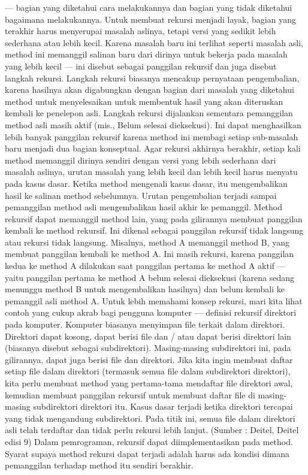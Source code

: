\documentclass[a4paper,12pt]{article}
\begin{document}
— bagian yang diketahui cara melakukannya dan bagian yang tidak diketahui bagaimana
melakukannya. Untuk membuat rekursi menjadi layak, bagian yang terakhir harus menyerupai
masalah aslinya, tetapi versi yang sedikit lebih sederhana atau lebih kecil. Karena masalah
baru ini terlihat seperti masalah asli, method ini memanggil salinan baru dari dirinya untuk
bekerja pada masalah yang lebih kecil — ini disebut sebagai panggilan rekursif dan juga
disebut langkah rekursi. Langkah rekursi biasanya mencakup pernyataan pengembalian, karena hasilnya akan digabungkan dengan bagian dari masalah yang diketahui method untuk
menyelesaikan untuk membentuk hasil yang akan diteruskan kembali ke penelepon asli. Langkah rekursi dijalankan sementara pemanggilan method asli masih aktif (mis., Belum
selesai dieksekusi). Ini dapat menghasilkan lebih banyak panggilan rekursif karena method ini
membagi setiap sub-masalah baru menjadi dua bagian konseptual. Agar rekursi akhirnya
berakhir, setiap kali method memanggil dirinya sendiri dengan versi yang lebih sederhana dari
masalah aslinya, urutan masalah yang lebih kecil dan lebih kecil harus menyatu pada kasus
dasar. Ketika method mengenali kasus dasar, itu mengembalikan hasil ke salinan method
sebelumnya. Urutan pengembalian terjadi sampai pemanggilan method asli mengembalikan
hasil akhir ke pemanggil. Method rekursif dapat memanggil method lain, yang pada gilirannya membuat panggilan
kembali ke method rekursif. Ini dikenal sebagai panggilan rekursif tidak langsung atau rekursi
tidak langsung. Misalnya, method A memanggil method B, yang membuat panggilan kembali
ke method A. Ini masih rekursi, karena panggilan kedua ke method A dilakukan saat panggilan
pertama ke method A aktif — yaitu panggilan pertama ke method A belum selesai dieksekusi
(karena sedang menunggu method B untuk mengembalikan hasilnya) dan belum kembali ke
pemanggil asli method A. Untuk lebih memahami konsep rekursi, mari kita lihat contoh yang
cukup akrab bagi pengguna komputer — definisi rekursif direktori pada komputer. Komputer
biasanya menyimpan file terkait dalam direktori. Direktori dapat kosong, dapat berisi file dan
/ atau dapat berisi direktori lain (biasanya disebut sebagai subdirektori). Masing-masing
subdirektori ini, pada gilirannya, dapat juga berisi file dan direktori. Jika kita ingin membuat
daftar setiap file dalam direktori (termasuk semua file dalam subdirektori direktori), kita
perlu membuat method yang pertama-tama mendaftar file direktori awal, kemudian
membuat panggilan rekursif untuk membuat daftar file di masing-masing subdirektori
direktori itu. Kasus dasar terjadi ketika direktori tercapai yang tidak mengandung subdirektori. Pada titik ini, semua file dalam direktori asli telah terdaftar dan tidak perlu rekursi lebih
lanjut. (Sumber : Deitel, Deitel edisi 9)
Dalam pemrograman, rekursif dapat diimplementasikan pada method. Syarat supaya method
rekursi dapat terjadi adalah harus ada kondisi dimana pemanggilan terhadap method itu
sendiri berakhir.
\newpage
\end{document}
